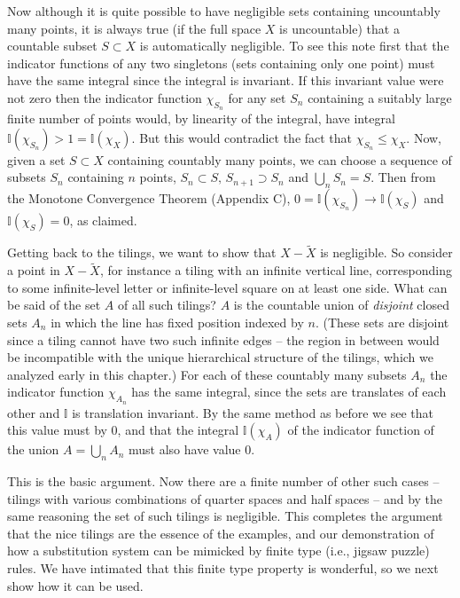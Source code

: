 \documentclass[reqno]{stml-l}
\theoremstyle{plain}
\theoremstyle{definition}
\numberwithin{equation}{chapter}
\begin{document}
Now although it is quite possible to have negligible sets containing uncountably many points, it is always true (if the full space $X$ is
uncountable) that a countable subset $S\subset X$ is automatically negligible. To see this note first that the indicator functions of any two singletons (sets containing only one point) must have the same integral since the integral is invariant. If this invariant value were not zero then the indicator function $\chi_{S_{n}}$ for any set $S_{n}$ containing a suitably large finite number of points would, by linearity of the integral, have integral $\mathbb{I}(\chi_{S_{n}})>1=\mathbb{I}(\chi_{X})$. But this would contradict the fact that $\chi_{S_{n}}\leq\chi_{X}$. Now, given a set $S\subset X$ containing countably many points, we can choose a sequence of subsets $S_{n}$ containing $n$ points, $S_{n}\subset S,\, S_{n+1}\supset S_{n}$ and $\bigcup_{n}S_{n}=S$. Then from the Monotone Convergence Theorem (Appendix C), $0=\mathbb{I}(\chi_{S_{n}})\longrightarrow\mathbb{I}(\chi_{S})$
and $\mathbb{I}(\chi_{S})=0$, as claimed.

Getting back to the tilings, we want to show that $X-\tilde{X}$ is negligible. So consider a point in $X-\tilde{X}$, for instance a tiling with an infinite vertical line, corresponding to some infinite-level letter or infinite-level square on at least one side. What can be said of the set $A$ of all such tilings? $A$ is the countable union of \emph{disjoint} closed sets $A_{n}$ in which the line has fixed position indexed by $n$. (These sets are disjoint since a tiling cannot have two such infinite edges -- the region in between would be incompatible with the unique hierarchical structure of the tilings, which we analyzed early in this chapter.) For each of these countably many subsets $A_{n}$ the indicator function $\chi_{A_{n}}$ has the same integral, since the sets are translates of each other and $\mathbb{I}$ is translation invariant. By the same method as before we see that this value must by $0$, and that the integral $\mathbb{I}(\chi_{A})$ of the indicator function of the union $A=\bigcup_{n}A_{n}$ must also have value $0$.

This is the basic argument. Now there are a finite number of other such cases
-- tilings with various combinations of quarter spaces and half spaces -- and by the same reasoning the set of such tilings is negligible. This completes the argument that the nice tilings are the essence of the examples, and our demonstration of how a substitution system can be mimicked by finite type (i.e., jigsaw puzzle) rules. We
have intimated that this finite type property is wonderful, so we next show how it can be used.
\end{document}
